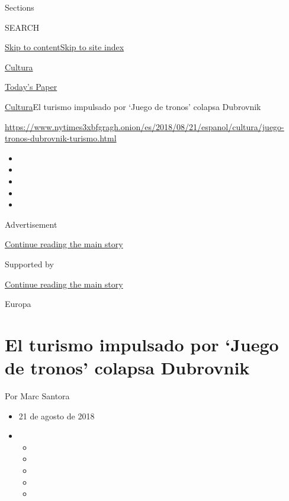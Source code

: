 Sections

SEARCH

\protect\hyperlink{site-content}{Skip to
content}\protect\hyperlink{site-index}{Skip to site index}

\href{https://www.nytimes3xbfgragh.onion/es/section/cultura}{Cultura}

\href{https://myaccount.nytimes3xbfgragh.onion/auth/login?response_type=cookie\&client_id=vi}{}

\href{https://www.nytimes3xbfgragh.onion/section/todayspaper}{Today's
Paper}

\href{/es/section/cultura}{Cultura}\textbar{}El turismo impulsado por
`Juego de tronos' colapsa Dubrovnik

\url{https://www.nytimes3xbfgragh.onion/es/2018/08/21/espanol/cultura/juego-tronos-dubrovnik-turismo.html}

\begin{itemize}
\item
\item
\item
\item
\item
\end{itemize}

Advertisement

\protect\hyperlink{after-top}{Continue reading the main story}

Supported by

\protect\hyperlink{after-sponsor}{Continue reading the main story}

Europa

\hypertarget{el-turismo-impulsado-por-juego-de-tronos-colapsa-dubrovnik}{%
\section{El turismo impulsado por `Juego de tronos' colapsa
Dubrovnik}\label{el-turismo-impulsado-por-juego-de-tronos-colapsa-dubrovnik}}

Por Marc Santora

\begin{itemize}
\item
  21 de agosto de 2018
\item
  \begin{itemize}
  \item
  \item
  \item
  \item
  \item
  \end{itemize}
\end{itemize}

